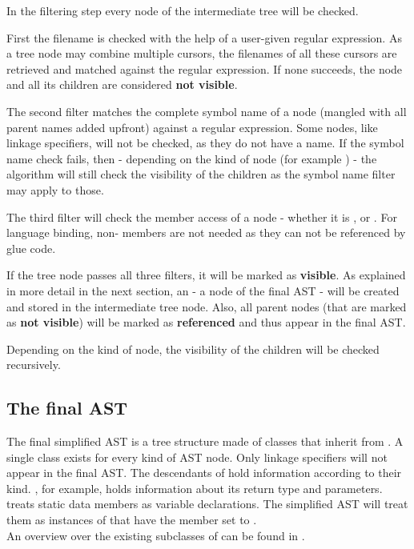 In the filtering step every node of the intermediate tree will be checked.

First the filename is checked with the help of a user-given regular expression. As a tree node may combine multiple cursors, the filenames of all these cursors are retrieved and matched against the regular expression. If none succeeds, the node and all its children are considered \textbf{not visible}.

The second filter matches the complete symbol name of a node (mangled with all parent names added upfront) against a regular expression. Some nodes, like linkage specifiers, will not be checked, as they do not have a name. If the symbol name check fails, then - depending on the kind of node (for example ) - the algorithm will still check the visibility of the children as the symbol name filter may apply to those.

The third filter will check the member access of a node - whether it is ,  or . For language binding, non- members are not needed as they can not be referenced by glue code.

If the tree node passes all three filters, it will be marked as \textbf{visible}. As explained in more detail in the next section, an  - a node of the final AST - will be created and stored in the intermediate tree node. Also, all parent nodes (that are marked as \textbf{not visible}) will be marked as \textbf{referenced} and thus appear in the final AST.

Depending on the kind of node, the visibility of the children will be checked recursively.


\subsection{The final AST}

The final simplified AST is a tree structure made of classes that inherit from
. A single class exists for every kind of AST node. Only linkage specifiers will not appear in the final AST. The descendants of  hold information according to their kind. , for example, holds information about its return type and parameters.  treats static data members as variable declarations. The simplified AST will treat them as instances of  that have the  member set to .\\
An overview over the existing subclasses of  can be found in .

